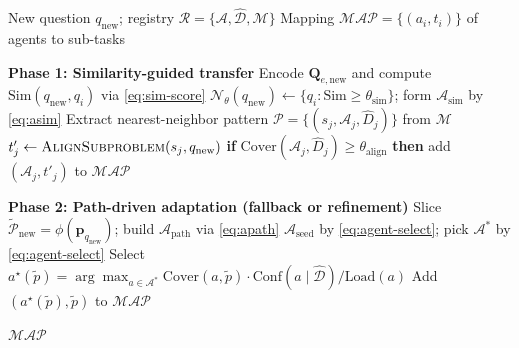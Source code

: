\documentclass[sigconf]{acmart}
\begin{document}
\begin{algorithm}[H]
\caption{Test-Question Decomposition and Agent Routing}
\label{alg:ag_tq_route}
\begin{algorithmic}[1]
\Require New question \(q_{\text{new}}\);
         registry \(\mathcal{R}=\{\mathcal{A},\hat{\mathcal{D}},\mathcal{M}\}\)
\Ensure Mapping \(\mathcal{MAP}=\{(a_i, t_i)\}\) of agents to sub-tasks

\State \textbf{Phase 1: Similarity-guided transfer}
\State Encode \(\mathbf{Q}_{e,\text{new}}\) and compute \(\text{Sim}(q_{\text{new}},q_i)\) via \eqref{eq:sim-score}
\State \(\mathcal{N}_\theta(q_{\text{new}})\leftarrow \{q_i:\text{Sim}\ge \theta_{\text{sim}}\}\); form \(\mathcal{A}_{\text{sim}}\) by \eqref{eq:asim}
    \State Extract nearest-neighbor pattern \(\mathcal{P}=\{(s_j,\mathcal{A}_j,\hat{D}_j)\}\) from \(\mathcal{M}\)
        \State \(t'_j \leftarrow \textsc{AlignSubproblem}(s_j, q_{\text{new}})\)
        \State \textbf{if} \(\text{Cover}(\mathcal{A}_j,\hat{D}_j)\ge \theta_{\text{align}}\) \textbf{then} add \((\mathcal{A}_j,t'_j)\) to \(\mathcal{MAP}\)
    \EndFor
\EndIf

\State \textbf{Phase 2: Path-driven adaptation (fallback or refinement)}
\State Slice \(\tilde{\mathcal{P}}_{\text{new}}=\phi(\mathbf{p}_{q_{\text{new}}})\); build \(\mathcal{A}_{\text{path}}\) via \eqref{eq:apath}
\State \(\mathcal{A}_{\text{seed}}\) by \eqref{eq:agent-select}; pick \(\mathcal{A}^*\) by \eqref{eq:agent-select}
    \State Select \(a^\star(\tilde{p})=\arg\max_{a\in \mathcal{A}^*}\text{Cover}(a,\tilde{p})\cdot \text{Conf}(a\mid \hat{\mathcal{D}})/\text{Load}(a)\)
    \State Add \((a^\star(\tilde{p}), \tilde{p})\) to \(\mathcal{MAP}\)
\EndFor

\State \Return \(\mathcal{MAP}\)
\end{algorithmic}
\end{algorithm}




\end{document}
